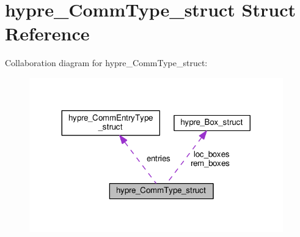 \hypertarget{structhypre__CommType__struct}{}\section{hypre\+\_\+\+Comm\+Type\+\_\+struct Struct Reference}
\label{structhypre__CommType__struct}


Collaboration diagram for hypre\+\_\+\+Comm\+Type\+\_\+struct\+:
\nopagebreak
\begin{figure}[H]
\begin{center}
\leavevmode
\includegraphics[width=311pt]{structhypre__CommType__struct__coll__graph}
\end{center}
\end{figure}
